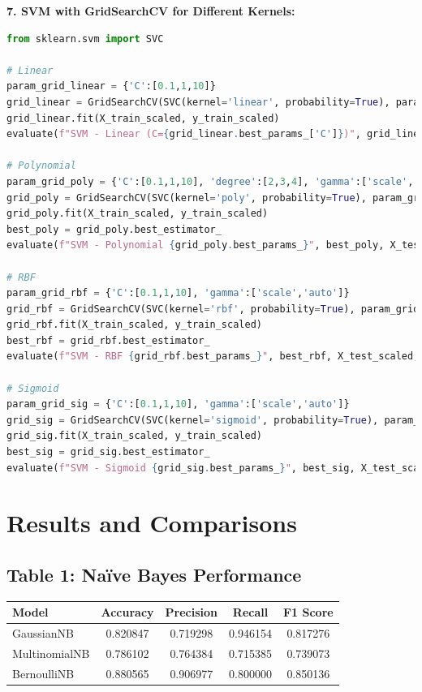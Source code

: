 \documentclass[12pt]{article}
\begin{document}
\textbf{7. SVM with GridSearchCV for Different Kernels:}
\begin{lstlisting}[language=Python]
from sklearn.svm import SVC

# Linear
param_grid_linear = {'C':[0.1,1,10]}
grid_linear = GridSearchCV(SVC(kernel='linear', probability=True), param_grid_linear, cv=5)
grid_linear.fit(X_train_scaled, y_train_scaled)
evaluate(f"SVM - Linear (C={grid_linear.best_params_['C']})", grid_linear.best_estimator_, X_test_scaled, y_test_scaled)

# Polynomial
param_grid_poly = {'C':[0.1,1,10], 'degree':[2,3,4], 'gamma':['scale','auto']}
grid_poly = GridSearchCV(SVC(kernel='poly', probability=True), param_grid_poly, cv=5)
grid_poly.fit(X_train_scaled, y_train_scaled)
best_poly = grid_poly.best_estimator_
evaluate(f"SVM - Polynomial {grid_poly.best_params_}", best_poly, X_test_scaled, y_test_scaled)

# RBF
param_grid_rbf = {'C':[0.1,1,10], 'gamma':['scale','auto']}
grid_rbf = GridSearchCV(SVC(kernel='rbf', probability=True), param_grid_rbf, cv=5)
grid_rbf.fit(X_train_scaled, y_train_scaled)
best_rbf = grid_rbf.best_estimator_
evaluate(f"SVM - RBF {grid_rbf.best_params_}", best_rbf, X_test_scaled, y_test_scaled)

# Sigmoid
param_grid_sig = {'C':[0.1,1,10], 'gamma':['scale','auto']}
grid_sig = GridSearchCV(SVC(kernel='sigmoid', probability=True), param_grid_sig, cv=5)
grid_sig.fit(X_train_scaled, y_train_scaled)
best_sig = grid_sig.best_estimator_
evaluate(f"SVM - Sigmoid {grid_sig.best_params_}", best_sig, X_test_scaled, y_test_scaled)
\end{lstlisting}

\section*{Results and Comparisons}

\subsection*{Table 1: Naïve Bayes Performance}
\begin{tabular}{|l|c|c|c|c|}
\hline
\textbf{Model} & \textbf{Accuracy} & \textbf{Precision} & \textbf{Recall} & \textbf{F1 Score} \\
\hline
GaussianNB & 0.820847 & 0.719298 & 0.946154 & 0.817276 \\
MultinomialNB & 0.786102 & 0.764384 & 0.715385 & 0.739073 \\
BernoulliNB & 0.880565 & 0.906977 & 0.800000 & 0.850136 \\
\hline
\end{tabular}
\end{document}
